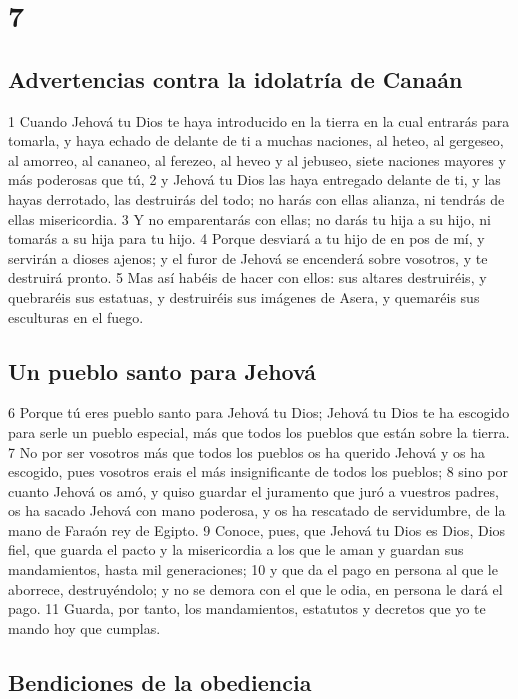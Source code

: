 \chapter{7}


\section{Advertencias contra la idolatría de Canaán }


1 Cuando Jehová tu Dios te haya introducido en la tierra en la cual entrarás para tomarla, y haya echado de delante de ti a muchas naciones, al heteo, al gergeseo, al amorreo, al cananeo, al ferezeo, al heveo y al jebuseo, siete naciones mayores y más poderosas que tú,
2 y Jehová tu Dios las haya entregado delante de ti, y las hayas derrotado, las destruirás del todo; no harás con ellas alianza, ni tendrás de ellas misericordia.
3 Y no emparentarás con ellas; no darás tu hija a su hijo, ni tomarás a su hija para tu hijo.
4 Porque desviará a tu hijo de en pos de mí, y servirán a dioses ajenos; y el furor de Jehová se encenderá sobre vosotros, y te destruirá pronto.
5 Mas así habéis de hacer con ellos: sus altares destruiréis, y quebraréis sus estatuas, y destruiréis sus imágenes de Asera, y quemaréis sus esculturas en el fuego.

\section{Un pueblo santo para Jehová}

6 Porque tú eres pueblo santo para Jehová tu Dios; Jehová tu Dios te ha escogido para serle un pueblo especial, más que todos los pueblos que están sobre la tierra.
7 No por ser vosotros más que todos los pueblos os ha querido Jehová y os ha escogido, pues vosotros erais el más insignificante de todos los pueblos;
8 sino por cuanto Jehová os amó, y quiso guardar el juramento que juró a vuestros padres, os ha sacado Jehová con mano poderosa, y os ha rescatado de servidumbre, de la mano de Faraón rey de Egipto.
9 Conoce, pues, que Jehová tu Dios es Dios, Dios fiel, que guarda el pacto y la misericordia a los que le aman y guardan sus mandamientos, hasta mil generaciones;
10 y que da el pago en persona al que le aborrece, destruyéndolo; y no se demora con el que le odia, en persona le dará el pago.
11 Guarda, por tanto, los mandamientos, estatutos y decretos que yo te mando hoy que cumplas.

\section{Bendiciones de la obediencia }

